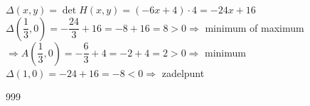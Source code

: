 \documentclass[a4paper]{article}
\begin{document}
$\Delta(x, y) = \operatorname{det} H(x, y) = (-6x + 4) \cdot 4 = -24x + 16$\\

$\Delta\left(\dfrac{1}{3}, 0\right) = -\dfrac{24}{3} + 16 = -8 + 16 = 8 > 0 \Rightarrow$ minimum of maximum\\

$\Rightarrow A\left(\dfrac{1}{3}, 0\right) = -\dfrac{6}{3} + 4 = -2 + 4 = 2 > 0\Rightarrow$ minimum\\

$\Delta(1, 0) = -24 + 16 = -8 < 0 \Rightarrow$ zadelpunt\\

\begin{thebibliography}{999}
\end{thebibliography}
\end{document}
